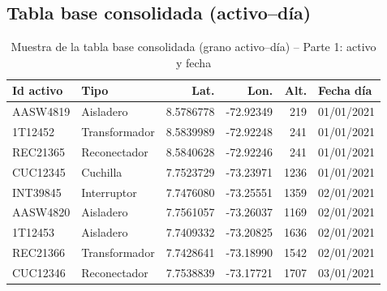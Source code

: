 \subsection{Tabla base consolidada (activo--día)}
\label{app:muestra-consolidado-completa}

\begin{table}[!htbp]
\centering
    \small
    \caption{Muestra de la tabla base consolidada (grano activo--día) -- Parte 1: activo y fecha}
    \label{tab:muestra_consolidado_final_1}
    \begin{tabular}{l l r r r l}
    \toprule
    \textbf{Id activo} & \textbf{Tipo} & \textbf{Lat.} & \textbf{Lon.} & \textbf{Alt.} & \textbf{Fecha día} \\
    \midrule
    AASW4819 & Aisladero      & 8.5786778 & -72.92349 & 219  & 01/01/2021 \\
    1T12452  & Transformador  & 8.5839989 & -72.92248 & 241  & 01/01/2021 \\
    REC21365 & Reconectador   & 8.5840628 & -72.92246 & 241  & 01/01/2021 \\
    CUC12345 & Cuchilla       & 7.7523729 & -73.23971 & 1236 & 01/01/2021 \\
    INT39845 & Interruptor    & 7.7476080 & -73.25551 & 1359 & 02/01/2021 \\
    AASW4820 & Aisladero      & 7.7561057 & -73.26037 & 1169 & 02/01/2021 \\
    1T12453  & Aisladero      & 7.7409332 & -73.20825 & 1636 & 02/01/2021 \\
    REC21366 & Transformador  & 7.7428641 & -73.18990 & 1542 & 02/01/2021 \\
    CUC12346 & Reconectador   & 7.7538839 & -73.17721 & 1707 & 03/01/2021 \\
    \bottomrule
    \end{tabular}
    \end{table}

